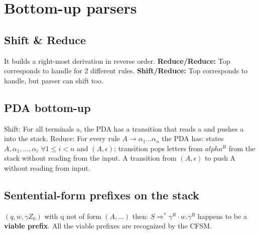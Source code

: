 \section{Bottom-up parsers}
\subsection*{Shift \& Reduce}
It builds a right-most derivation in reverse order. \textbf{Reduce/Reduce:} Top corresponds to handle for 2 different rules. \textbf{Shift/Reduce:} Top corresponds to handle, but parser can shift too.
\subsection*{PDA bottom-up}
Shift: For all terminals a, the PDA has a transition that reads a and pushes a into the stack. Reduce: For every rule $A \rightarrow \alpha_1...\alpha_n$ the PDA has: states $A,\alpha_1,...,\alpha_i$ $\forall 1 \leqslant i < n$ and $(A,\epsilon)$; transition pops letters from $alpha^R$ from the stack without reading from the input. A transition from $(A, \epsilon)$ to push A without reading from input.
\subsection*{Sentential-form prefixes on the stack}
$(q,w,\gamma Z_0)$ with q not of form $(A,...)$ then: $S \Rightarrow^* \gamma^R \cdot w$.$\gamma^R$ happens to be a \textbf{viable prefix}. All the viable prefixes are recognized by the CFSM.
